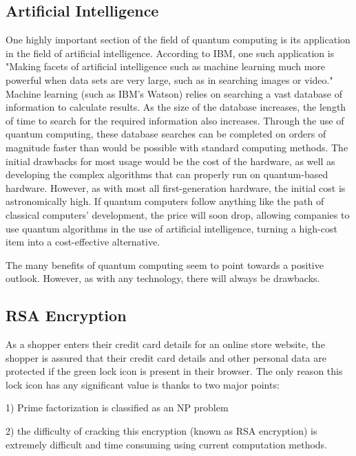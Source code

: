 \documentclass[10pt,journal,compsoc]{IEEEtran}
\begin{document}
 
 \subsection{Artificial Intelligence}
One highly important section of the field of quantum computing is its application in the field of artificial intelligence. According to IBM, one such application is "Making facets of artificial intelligence such as machine learning much more powerful when data sets are very large, such as in searching images or video."\cite{IBM} Machine learning (such as IBM's Watson) relies on searching a vast database of information to calculate results. As the size of the database increases, the length of time to search for the required information also increases. Through the use of quantum computing, these database searches can be completed on orders of magnitude faster than would be possible with standard computing methods\cite{IBM}. The initial drawbacks for most usage would be the cost of the hardware, as well as developing the complex algorithms that can properly run on quantum-based hardware. However, as with most all first-generation hardware, the initial cost is astronomically high. If quantum computers follow anything like the path of classical computers' development, the price will soon drop, allowing companies to use quantum algorithms in the use of artificial intelligence, turning a high-cost item into a cost-effective alternative. 

The many benefits of quantum computing seem to point towards a positive outlook. However, as with any technology, there will always be drawbacks. 
 

\subsection{RSA Encryption}

As a shopper enters their credit card details for an online store website, the shopper is assured that their credit card details and other personal data are protected if the green lock icon is present in their browser. The only reason this lock icon has any significant value is thanks to two major points: 

1) Prime factorization is classified as an NP problem

2) the difficulty of cracking this encryption (known as RSA encryption) is extremely difficult and time consuming using current computation methods. 
\end{document}
